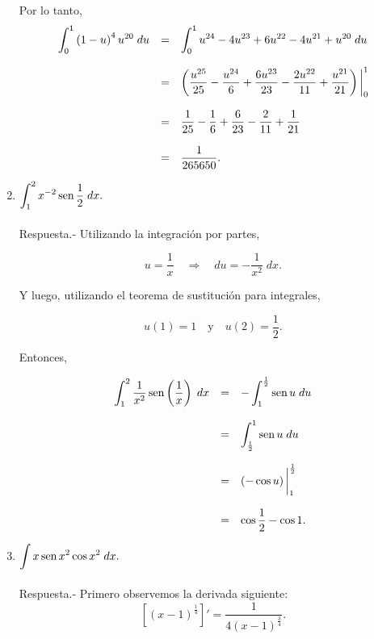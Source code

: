 \begin{enumerate}[\bfseries 1.]
	Por lo tanto,
	$$
	\begin{array}{rcl}
	    \displaystyle\int_0^1 \left(1-u\right)^4u^{20}\; du &=& \displaystyle\int_0^1 u^{24}-4u^{23}+6u^{22}-4u^{21}+u^{20}\; du\\\\
								&=& \left(\dfrac{u^{25}}{25}-\dfrac{u^{24}}{6}+\dfrac{6u^{23}}{23}-\dfrac{2u^{22}}{11}+\dfrac{u^{21}}{21}\right)\bigg|_0^1\\\\
								&=& \dfrac{1}{25}-\dfrac{1}{6}+\dfrac{6}{23}-\dfrac{2}{11}+\dfrac{1}{21}\\\\
								&=& \dfrac{1}{265650}.
	\end{array}
	\vspace{.5cm}
	$$

    \item $\displaystyle\int_1^2 x^{-2} \mathop{\mbox{\normalfont sen}}\nolimits \dfrac{1}{2}\; dx.$\\\\
	Respuesta.-\; Utilizando la integración por partes,

	$$u=\dfrac{1}{x}\quad \Rightarrow \quad du=-\dfrac{1}{x^2}\;dx.$$

	Y luego, utilizando el teorema de sustitución para integrales,

	$$u(1)=1\quad \mbox{y}\quad u(2)=\dfrac{1}{2}.$$

	Entonces,

	$$
	\begin{array}{rcl}
	    \displaystyle\int_1^2 \dfrac{1}{x^2}\mathop{\mbox{\normalfont sen}}\nolimits\left(\dfrac{1}{x}\right)\; dx &=& -\displaystyle\int_1^{\frac{1}{2}} \mathop{\mbox{\normalfont sen}}\nolimits u\; du\\\\
										   &=& \displaystyle\int_{\frac{1}{2}}^1 \mathop{\mbox{\normalfont sen}}\nolimits u\; du\\\\
										   &=& \left(-\cos u\right)\bigg|^{\frac{1}{2}}_1\\\\
										   &=& \cos\dfrac{1}{2}-\cos 1.
	\end{array}
	$$
	\vspace{.5cm}



    \item $\displaystyle\int x\mathop{\mbox{\normalfont sen}}\nolimits x^2 \cos x^2\; dx.$\\\\
	Respuesta.-\; Primero observemos la derivada siguiente:
	$$\left[(x-1)^{\frac{1}{4}}\right]'=\dfrac{1}{4(x-1)^{\frac{3}{4}}}.$$


\end{enumerate}
